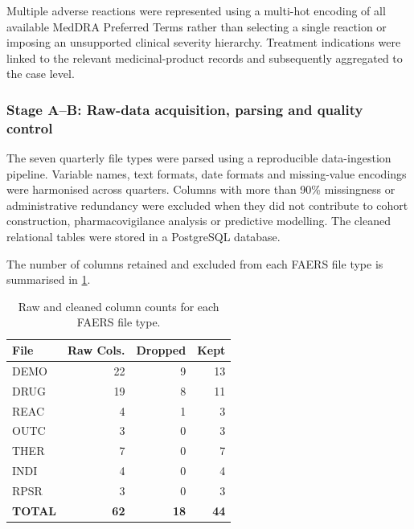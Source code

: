 \documentclass[10pt]{article}
\renewcommand{\arraystretch}{1.28}
\begin{document}
Multiple adverse reactions were represented using a multi-hot encoding of all available MedDRA Preferred Terms rather than selecting a single reaction or imposing an unsupported clinical severity hierarchy. Treatment indications were linked to the relevant medicinal-product records and subsequently aggregated to the case level.

\subsubsection{Stage A--B: Raw-data acquisition, parsing and quality control}
The seven quarterly file types were parsed using a reproducible data-ingestion pipeline. Variable names, text formats, date formats and missing-value encodings were harmonised across quarters. Columns with more than 90\% missingness or administrative redundancy were excluded when they did not contribute to cohort construction, pharmacovigilance analysis or predictive modelling. The cleaned relational tables were stored in a PostgreSQL database.

The number of columns retained and excluded from each FAERS file type is summarised in \cref{tab:colcounts}.

\begin{table}[htbp]
\caption{Raw and cleaned column counts for each FAERS file type.}
\label{tab:colcounts}
\centering\normalsize\setlength{\tabcolsep}{18pt}
\renewcommand{\arraystretch}{1.5}
\begin{tabular}{|l|r|r|r|}
\hline
\textbf{File}&
\textbf{Raw Cols.}&
\textbf{Dropped}&
\textbf{Kept}\\
\hline
DEMO&22&9&13\\
\hline
DRUG&19&8&11\\
\hline
REAC&4&1&3\\
\hline
OUTC&3&0&3\\
\hline
THER&7&0&7\\
\hline
INDI&4&0&4\\
\hline
RPSR&3&0&3\\
\hline
\textbf{TOTAL}&\textbf{62}&\textbf{18}&\textbf{44}\\
\hline
\end{tabular}
\end{table}
 
\end{document}
